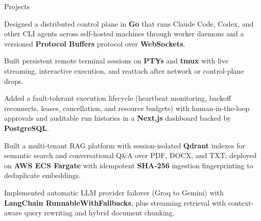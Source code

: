 \documentclass{resume}
\begin{document}
\begin{rSection}{Projects}
\scriptsize

\begin{jobitems}
    \item Designed a distributed control plane in \textbf{Go} that runs Claude Code, Codex, and other CLI agents across self-hosted machines through worker daemons and a versioned \textbf{Protocol Buffers} protocol over \textbf{WebSockets}.
    \item Built persistent remote terminal sessions on \textbf{PTYs} and \textbf{tmux} with live streaming, interactive execution, and reattach after network or control-plane drops.
    \item Added a fault-tolerant execution lifecycle (heartbeat monitoring, backoff reconnects, leases, cancellation, and resource budgets) with human-in-the-loop approvals and auditable run histories in a \textbf{Next.js} dashboard backed by \textbf{PostgreSQL}.
\end{jobitems}

\begin{jobitems}
    \item Built a multi-tenant RAG platform with session-isolated \textbf{Qdrant} indexes for semantic search and conversational Q\&A over PDF, DOCX, and TXT; deployed on \textbf{AWS ECS Fargate} with idempotent \textbf{SHA-256} ingestion fingerprinting to deduplicate embeddings.
    \item Implemented automatic LLM provider failover (Groq to Gemini) with \textbf{LangChain RunnableWithFallbacks}, plus streaming retrieval with context-aware query rewriting and hybrid document chunking.
\end{jobitems}

\end{rSection}\vspace{-0.7em}
\end{document}
